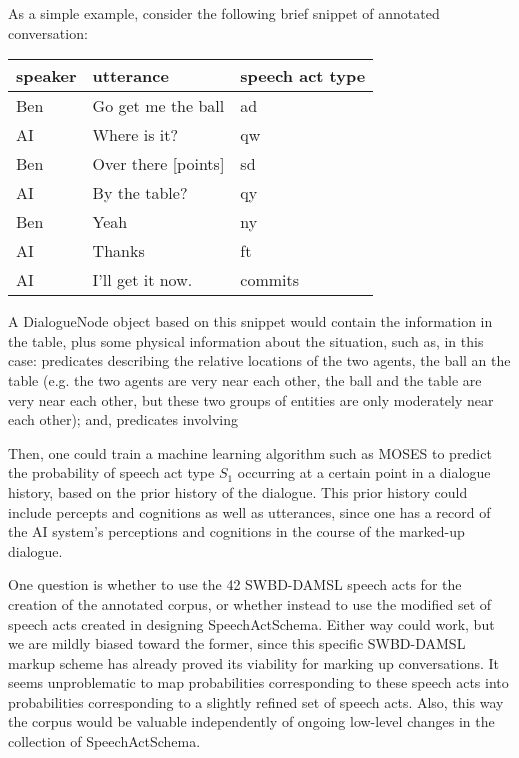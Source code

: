 \documentclass[10pt]{article}
\begin{document}
As a simple example, consider the following brief snippet of annotated conversation:
  \\
\begin{center}
\begin{tabular}{|l|l|l|}
\hline
{\bf speaker} & {\bf utterance} & {\bf speech act type} \\ \hline
Ben & Go get me the ball & ad \\ \hline
AI & Where is it? & qw \\  \hline
Ben & Over there [points] & sd \\  \hline
AI & By the table?  & qy \\  \hline
Ben & Yeah & ny \\  \hline
AI & Thanks  & ft \\  \hline
AI & I'll get it now. & commits \\  \hline
\end{tabular}
\end{center}
  

\noindent A DialogueNode object based on this snippet would contain the information in the table, plus some physical information about the situation, such as, in this case: predicates describing the relative locations of the two agents, the ball an the table (e.g. the two agents are very near each other, the ball and the table are very near each other, but these two groups of entities are only moderately near each other); and, predicates involving 

Then, one could train a machine learning algorithm such as MOSES to predict the probability of speech act type $S_1$ occurring at a certain point in a dialogue history, based on the prior history of the dialogue.  This prior history could include percepts and cognitions as well as utterances, since one has a record of the AI system's perceptions and cognitions in the course of the marked-up dialogue.

One question is whether to use the 42 SWBD-DAMSL speech acts for the creation of the annotated corpus, or whether instead to use the modified set of speech acts created in designing SpeechActSchema.  Either way could work, but we are mildly biased toward the former, since this specific SWBD-DAMSL markup scheme has already proved its viability for marking up conversations.  It seems unproblematic to map probabilities corresponding to these speech acts into probabilities corresponding to a slightly refined set of speech acts.  Also, this way the corpus would be valuable independently of ongoing low-level changes in the collection of SpeechActSchema.
\end{document}
